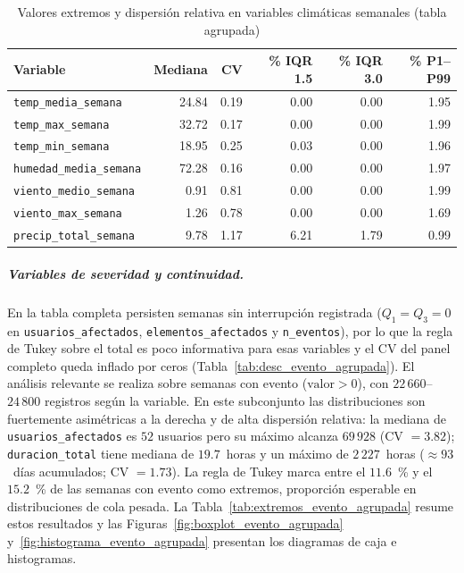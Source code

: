     \begin{table}[!htbp]
    \centering
    \small
    \caption{Valores extremos y dispersión relativa en variables climáticas semanales (tabla agrupada)}
    \label{tab:extremos_clima_agrupada}
    \begin{tabular}{l r r r r r}
    \toprule
    \textbf{Variable} & \textbf{Mediana} & \textbf{CV} & \textbf{\% IQR 1.5} & \textbf{\% IQR 3.0} & \textbf{\% P1--P99} \\
    \midrule
    \texttt{temp\_media\_semana}    & 24.84 & 0.19 & 0.00 & 0.00 & 1.95 \\
    \texttt{temp\_max\_semana}      & 32.72 & 0.17 & 0.00 & 0.00 & 1.99 \\
    \texttt{temp\_min\_semana}      & 18.95 & 0.25 & 0.03 & 0.00 & 1.96 \\
    \texttt{humedad\_media\_semana} & 72.28 & 0.16 & 0.00 & 0.00 & 1.97 \\
    \texttt{viento\_medio\_semana}  & 0.91  & 0.81 & 0.00 & 0.00 & 1.99 \\
    \texttt{viento\_max\_semana}    & 1.26  & 0.78 & 0.00 & 0.00 & 1.69 \\
    \texttt{precip\_total\_semana}  & 9.78  & 1.17 & 6.21 & 1.79 & 0.99 \\
    \bottomrule
    \end{tabular}
\end{table}

    
    
    \subparagraph{Variables de severidad y continuidad.} En la tabla completa persisten semanas sin interrupción registrada ($Q_1 = Q_3 = 0$ en \texttt{usuarios\_afectados}, \texttt{elementos\_afectados} y \texttt{n\_eventos}), por lo que la regla de Tukey sobre el total es poco informativa para esas variables y el CV del panel completo queda inflado por ceros (Tabla~\ref{tab:desc_evento_agrupada}). El análisis relevante se realiza sobre semanas con evento ($\text{valor} > 0$), con $22\,660$--$24\,800$ registros según la variable. En este subconjunto las distribuciones son fuertemente asimétricas a la derecha y de alta dispersión relativa: la mediana de \texttt{usuarios\_afectados} es $52$ usuarios pero su máximo alcanza $69\,928$ (CV $= 3{.}82$); \texttt{duracion\_total} tiene mediana de $19{.}7$~horas y un máximo de $2\,227$~horas ($\approx 93$~días acumulados; CV $= 1{.}73$). La regla de Tukey marca entre el $11{.}6$~\% y el $15{.}2$~\% de las semanas con evento como extremos, proporción esperable en distribuciones de cola pesada. La Tabla~\ref{tab:extremos_evento_agrupada} resume estos resultados y las Figuras~\ref{fig:boxplot_evento_agrupada} y~\ref{fig:histograma_evento_agrupada} presentan los diagramas de caja e histogramas.

